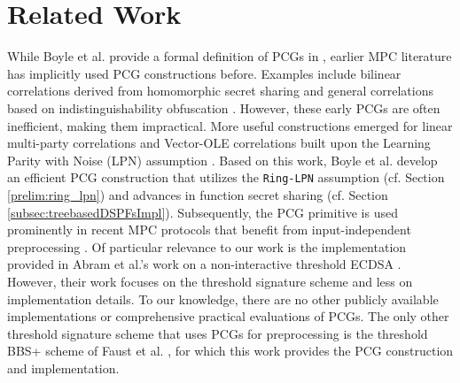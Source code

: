 \section{Related Work}
While Boyle et al. provide a formal definition of PCGs in \cite{boyle2019efficient}, earlier MPC literature has implicitly used PCG constructions before. Examples include bilinear correlations derived from homomorphic secret sharing \cite{boyle2017homomorphic} and general correlations based on indistinguishability obfuscation \cite{halevi2016secure}. However, these early PCGs are often inefficient, making them impractical. More useful constructions emerged for linear multi-party correlations \cite{cramer2005share, gilboa1999compressing} and Vector-OLE correlations built upon the Learning Parity with Noise (LPN) assumption \cite{boyle2018compressingVole, schoppmann2019distributedVole}. Based on this work, Boyle et al. develop an efficient PCG construction \cite{boyle2019efficient, boyle2020efficient} that utilizes the \texttt{Ring-LPN} assumption (cf. Section \ref{prelim:ring_lpn}) and advances in function secret sharing \cite{boyle2015function, boyle2016function} (cf. Section \ref{subsec:treebasedDSPFsImpl}). Subsequently, the PCG primitive is used prominently in recent MPC protocols that benefit from input-independent preprocessing \cite{bui2022private, abram2022low, wagh2022barnowl, dittmer2022authenticated, cryptoeprint:2023/1076, kondi2023two, bui2023improved}.  Of particular relevance to our work is the implementation provided in Abram et al.'s work on a non-interactive threshold ECDSA \cite{abram2022low}. However, their work focuses on the threshold signature scheme and less on implementation details. To our knowledge, there are no other publicly available implementations or comprehensive practical evaluations of PCGs. The only other threshold signature scheme that uses PCGs for preprocessing is the threshold BBS+ scheme of Faust et al. \cite{cryptoeprint:2023/1076}, for which this work provides the PCG construction and implementation.
